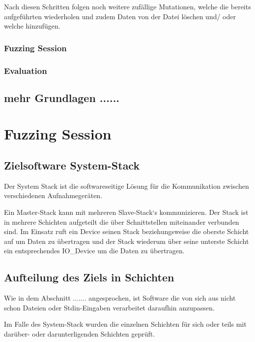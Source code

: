 \documentclass[12pt,a4paper]{scrreprt}
\begin{document}
Nach diesen Schritten folgen noch weitere zufällige Mutationen, welche die bereits aufgeführten wiederholen und zudem Daten von der Datei löschen und/ oder welche hinzufügen. 


\subsection{Fuzzing Session}

\subsection{Evaluation}

\section{mehr Grundlagen ......}


\newpage
\chapter{Fuzzing Session}

\section{Zielsoftware System-Stack}
Der System Stack ist die softwareseitige Lösung für die Kommunikation zwischen verschiedenen Aufnahmegeräten.

Ein Master-Stack kann mit mehreren Slave-Stack`s kommunizieren. Der Stack ist in mehrere Schichten aufgeteilt die über Schnittstellen miteinander verbunden sind. Im Einsatz ruft ein Device seinen Stack beziehungsweise die oberste Schicht auf um Daten zu übertragen und der Stack wiederum über seine unterste Schicht ein entsprechendes IO\_Device um die Daten zu übertragen.


\section{Aufteilung des Ziels in Schichten}

Wie in dem Abschnitt ....... angesprochen, ist Software die von sich aus nicht schon Dateien oder Stdin-Eingaben verarbeitet daraufhin anzupassen.

Im Falle des System-Stack wurden die einzelnen Schichten für sich oder teils mit darüber- oder darunterligenden Schichten geprüft. 
\end{document}
